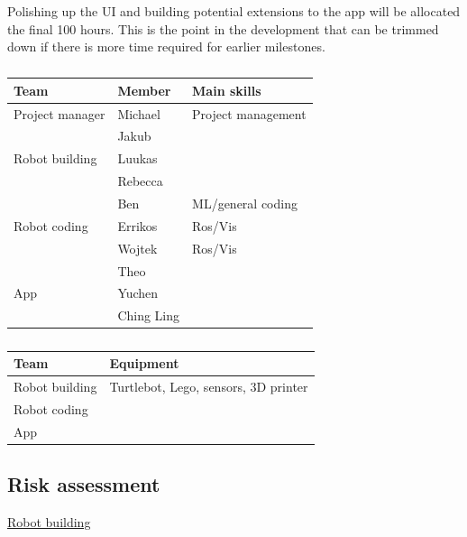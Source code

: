 \documentclass{article}
\begin{document}
Polishing up the UI and building potential extensions to the app will be allocated the final 100 hours. This is the point in the development that can be trimmed down if there is more time required for earlier milestones.

\begin{table}[]
  \begin{tabular}{|l|l|l|}
    \hline
    {\bf Team}           & {\bf Member}& {\bf Main skills} \\ \hline
    Project manager      & Michael     & Project management \\ \hline
                         & Jakub       & \\ \cline{2-3}
    Robot building       & Luukas      & \\ \cline{2-3}
                         & Rebecca     & \\ \hline
                         & Ben         & ML/general coding\\ \cline{2-3}
    Robot coding         & Errikos     & Ros/Vis \\ \cline{2-3}
                         & Wojtek      & Ros/Vis \\ \hline
                         & Theo        & \\ \cline{2-3}
    App                  & Yuchen      & \\ \cline{2-3}
                         & Ching Ling  & \\ \hline
  \end{tabular}
  \caption{}
\end{table}

\begin{table}[]
  \begin{tabular}{|l|l|}
    \hline
    {\bf Team}           & {\bf Equipment} \\ \hline
    Robot building       & Turtlebot, Lego, sensors, 3D printer\\ \hline
    Robot coding         & \\ \hline
    App                  & \\ \hline
  \end{tabular}
  \caption{}
\end{table}

\subsection{Risk assessment} 

\underline{Robot building}
\end{document}
